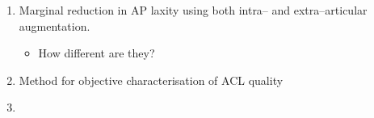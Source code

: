 \begin{enumerate}
    \item Marginal reduction in AP laxity using both intra-- and extra--articular augmentation. \begin{itemize}
        \item How different are they?
    \end{itemize}
    \item Method for objective characterisation of ACL quality
    \item 
\end{enumerate}

